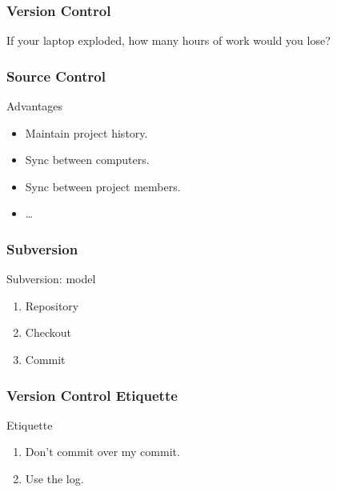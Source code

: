 \begin{frame}[fragile]
\frametitle{Version Control}

If your laptop exploded, how many hours of work would you lose?
\end{frame}

\begin{frame}[fragile]
\frametitle{Source Control}
\begin{block}{Advantages}
\begin{itemize}
\item Maintain project history.
\item Sync between computers.
\item Sync between project members.
\item \ldots
\end{itemize}
\end{block}
\end{frame}

\begin{frame}[fragile]
\frametitle{Subversion}
\begin{block}{Subversion: model}
\begin{enumerate}
\item Repository
\item Checkout
\item Commit
\end{enumerate}
\end{block}
\end{frame}

\begin{frame}[fragile]
\frametitle{Version Control Etiquette}
\begin{block}{Etiquette}
\begin{enumerate}
\item Don't commit over my commit.
\item Use the log.
\end{enumerate}
\end{block}
\end{frame}



